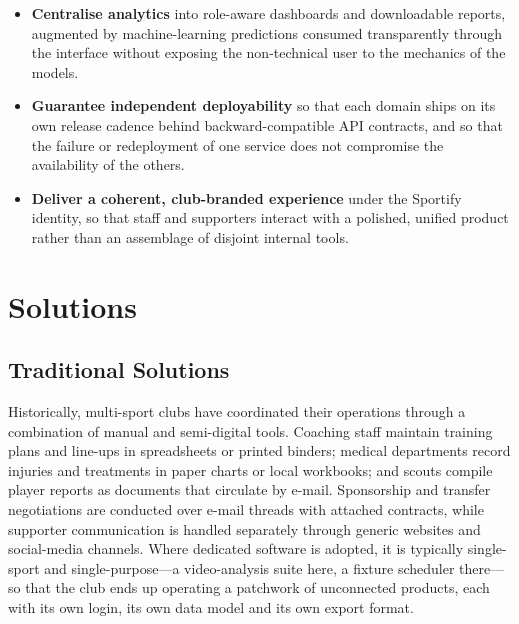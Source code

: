 \begin{itemize}
        and rehabilitation state immediately legible at the level of both the individual and
        the squad.
  \item \textbf{Centralise analytics} into role-aware dashboards and downloadable reports,
        augmented by machine-learning predictions consumed transparently through the
        interface without exposing the non-technical user to the mechanics of the models.
  \item \textbf{Guarantee independent deployability} so that each domain ships on its own
        release cadence behind backward-compatible API contracts, and so that the failure or
        redeployment of one service does not compromise the availability of the others.
  \item \textbf{Deliver a coherent, club-branded experience} under the Sportify identity,
        so that staff and supporters interact with a polished, unified product rather than an
        assemblage of disjoint internal tools.
\end{itemize}

\section{Solutions}
\label{sec:solutions}

\subsection{Traditional Solutions}
\label{subsec:traditional}

Historically, multi-sport clubs have coordinated their operations through a combination of
manual and semi-digital tools. Coaching staff maintain training plans and line-ups in
spreadsheets or printed binders; medical departments record injuries and treatments in
paper charts or local workbooks; and scouts compile player reports as documents that
circulate by e-mail. Sponsorship and transfer negotiations are conducted over e-mail
threads with attached contracts, while supporter communication is handled separately
through generic websites and social-media channels. Where dedicated software is adopted,
it is typically single-sport and single-purpose---a video-analysis suite here, a fixture
scheduler there---so that the club ends up operating a patchwork of unconnected products,
each with its own login, its own data model and its own export format.

